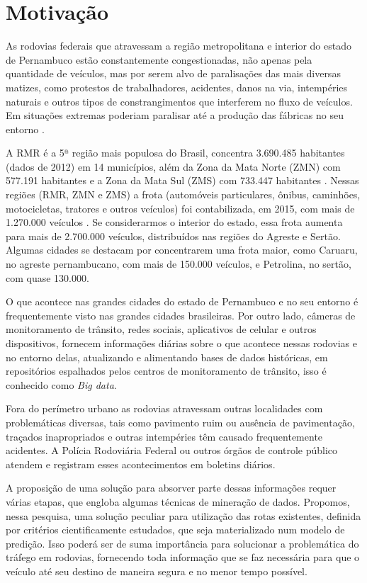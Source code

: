 
\section{ Motivação}\label{intro:motivacao}

As rodovias federais que atravessam a região metropolitana e interior do estado de Pernambuco estão constantemente congestionadas, não apenas pela 
quantidade de veículos, mas por serem alvo de paralisações das mais diversas matizes, como protestos de trabalhadores, acidentes, danos na via, intempéries naturais e outros tipos de constrangimentos que interferem no fluxo de veículos. 
Em situações extremas poderiam paralisar até a produção das fábricas no seu entorno \cite{BNDES2013}. 

A RMR é a 5ª região mais populosa do Brasil, concentra 3.690.485 habitantes (dados de 2012) em 14 municípios, além da 
Zona da Mata Norte (ZMN) com 577.191 habitantes e a Zona da Mata Sul (ZMS) com 733.447 habitantes \cite{Bitoun2012}. 
Nessas regiões (RMR, ZMN e ZMS) a frota (automóveis particulares, ônibus, caminhões, motocicletas, tratores e outros veículos) 
foi contabilizada, em 2015, com mais de 1.270.000 veículos \cite{FrotaVeiculosIBGE}. Se considerarmos o interior do estado, essa frota aumenta para mais de 2.700.000 veículos, distribuídos nas regiões do Agreste e Sertão. Algumas cidades se destacam por concentrarem uma frota maior, como Caruaru, no agreste pernambucano, com mais de 150.000 veículos, e Petrolina, no sertão, com quase 130.000. 
																			
O que acontece nas grandes cidades do estado de Pernambuco e no seu entorno é frequentemente visto nas grandes cidades brasileiras.
Por outro lado, câmeras de monitoramento de trânsito, redes sociais, aplicativos de celular e outros dispositivos, fornecem informações diárias sobre o que acontece nessas 
rodovias e no entorno delas, atualizando e alimentando bases de dados históricas, em repositórios espalhados pelos centros de 
monitoramento de trânsito, isso é conhecido como \textit{Big data}.

Fora do perímetro urbano as rodovias atravessam outras localidades com problemáticas diversas, tais como pavimento ruim ou ausência de pavimentação, 
traçados inapropriados e outras intempéries têm causado frequentemente acidentes.
A Polícia Rodoviária Federal ou outros órgãos de controle público atendem e registram esses acontecimentos em boletins diários.

A proposição de uma solução para absorver parte dessas informações requer várias etapas, que engloba algumas técnicas de mineração de dados.
Propomos, nessa pesquisa, uma solução peculiar para utilização das rotas existentes, definida por critérios cientificamente estudados, que seja materializado num modelo de predição.
Isso poderá ser de suma importância para solucionar a problemática do tráfego em rodovias, fornecendo toda informação que se faz necessária para que o veículo até seu destino de maneira segura e no menor tempo possível.

